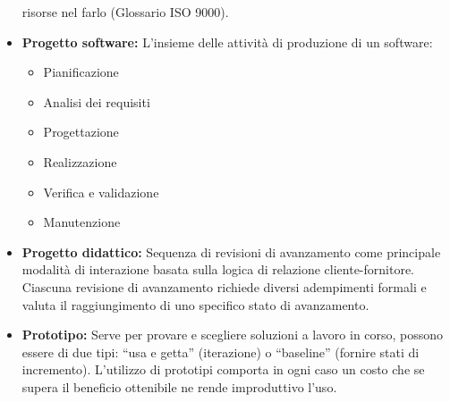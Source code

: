 \documentclass[a4paper]{article}
\begin{document}
\begin{itemize}
			risorse nel farlo (Glossario ISO 9000).
			\item \textbf{Progetto software:} L’insieme delle attività di produzione di un software:
			\begin{itemize}
				\item  Pianificazione
			  	\item  Analisi dei requisiti
			  	\item  Progettazione
			  	\item  Realizzazione
			  	\item  Verifica e validazione
			  	\item  Manutenzione
			\end{itemize}
			\item \textbf{Progetto didattico:} Sequenza di revisioni di avanzamento come principale modalità di interazione basata 
			sulla logica di relazione cliente-fornitore. Ciascuna revisione di avanzamento richiede diversi adempimenti formali e 
			valuta il raggiungimento di uno specifico stato di avanzamento.
			\item \textbf{Prototipo:} Serve per provare e scegliere soluzioni a lavoro in corso, possono essere di due tipi: “usa e getta” 
			(iterazione) o “baseline” (fornire stati di incremento). L’utilizzo di prototipi comporta in ogni caso un costo che se supera 
			il beneficio ottenibile ne rende improduttivo l’uso.
		\end{itemize}
		
\end{document}
